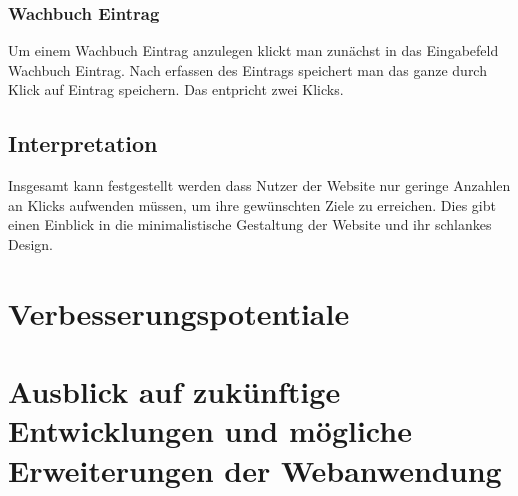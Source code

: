 \documentclass[fontsize=12pt,openright,oneside,paper=a4,BCOR=1cm]{scrbook}
\begin{document}
\subsubsection{Wachbuch Eintrag}
Um einem Wachbuch Eintrag anzulegen klickt man zunächst in das Eingabefeld \glqq Wachbuch Eintrag\grqq{}. Nach erfassen des Eintrags speichert man das ganze durch Klick auf \glqq Eintrag speichern\grqq{}. Das entpricht zwei Klicks.

\subsection{Interpretation}
Insgesamt kann festgestellt werden dass Nutzer der Website nur geringe Anzahlen an Klicks aufwenden müssen, um ihre gewünschten Ziele zu erreichen. Dies gibt einen Einblick in die minimalistische Gestaltung der Website und ihr schlankes Design. \\ 



\section{Verbesserungspotentiale}

\section{Ausblick auf zukünftige Entwicklungen und mögliche Erweiterungen der Webanwendung}


%
%




\end{document}
